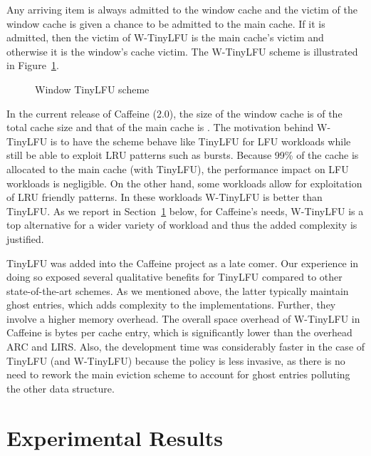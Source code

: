 \documentclass[10pt,a4paper]{article}
\begin{document}
Any arriving item is always admitted to the window cache and the victim of the window cache is given a chance to be admitted to the main cache.
If it is admitted, then the victim of W-TinyLFU is the main cache's victim and otherwise it is the window's cache victim.
The W-TinyLFU scheme is illustrated in Figure~\ref{fig:wtinylfu}.

\begin{figure}[t]
	\caption{Window TinyLFU scheme}
	\label{fig:wtinylfu}
\end{figure}

In the current release of Caffeine (2.0), the size of the window cache is  of the total cache size and that of the main cache is .
The motivation behind W-TinyLFU is to have the scheme behave like TinyLFU for LFU workloads while still be able to exploit LRU patterns such as bursts.
Because 99\% of the cache is allocated to the main cache (with TinyLFU), the performance impact on LFU workloads is negligible.
On the other hand, some workloads allow for exploitation of LRU friendly patterns.
In these workloads W-TinyLFU is better than TinyLFU.
As we report in Section~\ref{sec:results} below, for Caffeine's needs, W-TinyLFU is a top alternative for a wider variety of workload and thus the added complexity is justified.

TinyLFU was added into the Caffeine project as a late comer.
Our experience in doing so exposed several qualitative benefits for TinyLFU compared to other state-of-the-art schemes.
As we mentioned above, the latter typically maintain ghost entries, which adds complexity to the implementations.
Further, they involve a higher memory overhead.
The overall space overhead of W-TinyLFU in Caffeine is  bytes per cache entry, which is significantly lower than the overhead ARC and LIRS.
Also, the development time was considerably faster in the case of TinyLFU (and W-TinyLFU) because the policy is less invasive, as there is no need to rework the main eviction scheme to account for ghost entries polluting the other data structure.














\section{Experimental Results}
\label{sec:results}
\end{document}
